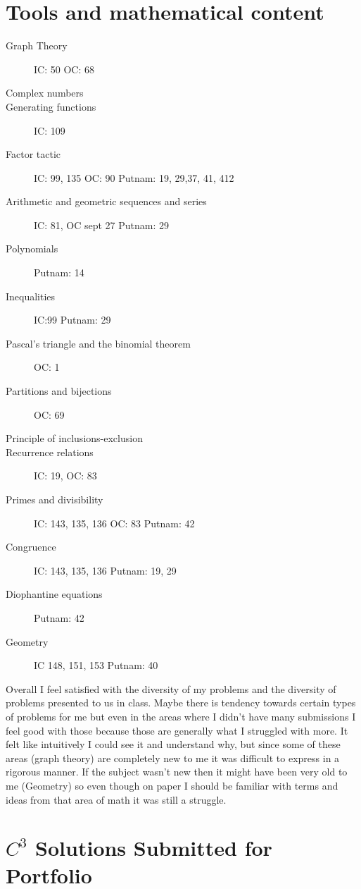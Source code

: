 \documentclass[11pt]{article}
\begin{document}
\section{Tools and mathematical content}
\begin{description}
    \item[Graph Theory] IC: 50 OC: 68
    \item[Complex numbers]
    \item[Generating functions] IC: 109
    \item[Factor tactic]IC: 99, 135 OC: 90 Putnam: 19, 29,37, 41, 412 
    \item[Arithmetic and geometric sequences and series] IC: 81, OC sept 27 Putnam: 29
    \item[Polynomials] Putnam: 14
    \item[Inequalities] IC:99 Putnam: 29
    \item[Pascal's triangle and the binomial theorem] OC: 1
    \item[Partitions and bijections] OC: 69
    \item[Principle of inclusions-exclusion]
    \item[Recurrence relations] IC: 19, OC: 83
    \item[Primes and divisibility] IC: 143, 135, 136 OC: 83 Putnam: 42
    \item[Congruence] IC: 143, 135, 136 Putnam: 19, 29
    \item[Diophantine equations] Putnam: 42
    \item[Geometry] IC 148, 151, 153 Putnam: 40         
\end{description}

Overall I feel satisfied with the diversity of my problems and the diversity of problems presented to us in class. Maybe there is tendency towards certain types of problems for me but even in the areas where I didn't have many submissions I feel good with those because those are generally what I struggled with more. It felt like intuitively I could see it and understand why, but since some of these areas (graph theory) are completely new to me it was difficult to express in a rigorous manner. If the subject wasn't new then it might have been very old to me (Geometry) so even though on paper I should be familiar with terms and ideas from that area of math it was still a struggle.  
\newpage
\section{$C^{3}$ Solutions Submitted for Portfolio}
\end{document}
